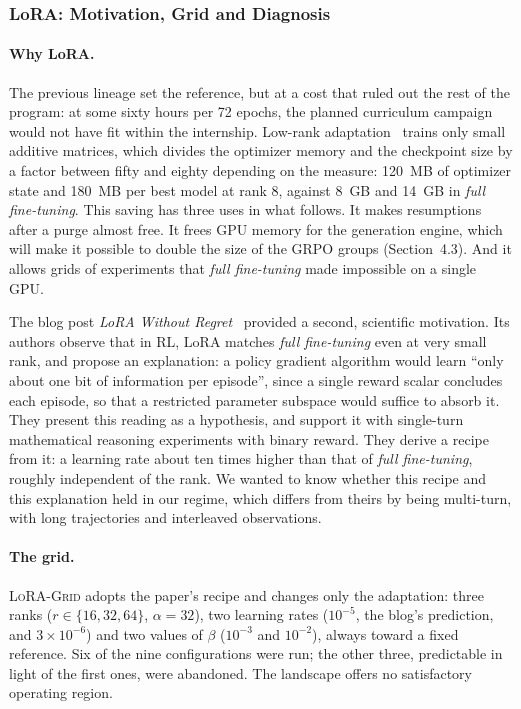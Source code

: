 \documentclass[11pt,a4paper]{article}
\begin{document}
\subsubsection{LoRA: Motivation, Grid and Diagnosis}

\paragraph{Why LoRA.} The previous lineage set the reference, but at a cost that ruled out the rest of the program: at some sixty hours per 72 epochs, the planned curriculum campaign would not have fit within the internship. Low-rank adaptation~\cite{hu2022lora} trains only small additive matrices, which divides the optimizer memory and the checkpoint size by a factor between fifty and eighty depending on the measure: 120~MB of optimizer state and 180~MB per best model at rank 8, against 8~GB and 14~GB in \emph{full fine-tuning}. This saving has three uses in what follows. It makes resumptions after a purge almost free. It frees GPU memory for the generation engine, which will make it possible to double the size of the GRPO groups (Section~4.3). And it allows grids of experiments that \emph{full fine-tuning} made impossible on a single GPU.

The blog post \emph{LoRA Without Regret}~\cite{schulman2025lora} provided a second, scientific motivation. Its authors observe that in RL, LoRA matches \emph{full fine-tuning} even at very small rank, and propose an explanation: a policy gradient algorithm would learn ``only about one bit of information per episode'', since a single reward scalar concludes each episode, so that a restricted parameter subspace would suffice to absorb it. They present this reading as a hypothesis, and support it with single-turn mathematical reasoning experiments with binary reward. They derive a recipe from it: a learning rate about ten times higher than that of \emph{full fine-tuning}, roughly independent of the rank. We wanted to know whether this recipe and this explanation held in our regime, which differs from theirs by being multi-turn, with long trajectories and interleaved observations.

\paragraph{The grid.} \textsc{LoRA-Grid} adopts the paper's recipe and changes only the adaptation: three ranks ($r \in \{16, 32, 64\}$, $\alpha = 32$), two learning rates ($10^{-5}$, the blog's prediction, and $3 \times 10^{-6}$) and two values of $\beta$ ($10^{-3}$ and $10^{-2}$), always toward a fixed reference. Six of the nine configurations were run; the other three, predictable in light of the first ones, were abandoned. The landscape offers no satisfactory operating region.
\end{document}
